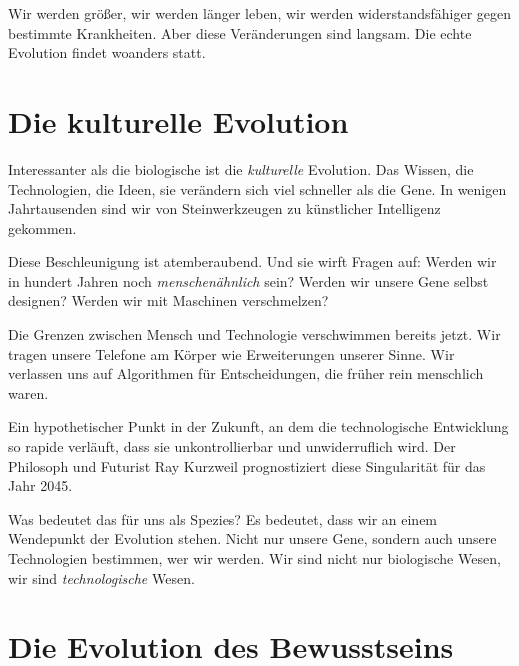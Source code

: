 Wir werden größer, wir werden länger leben, wir werden widerstandsfähiger gegen bestimmte Krankheiten. Aber diese Veränderungen sind langsam. Die echte Evolution findet woanders statt.

\section{Die kulturelle Evolution}

Interessanter als die biologische ist die \emph{kulturelle} Evolution. Das Wissen, die Technologien, die Ideen, sie verändern sich viel schneller als die Gene. In wenigen Jahrtausenden sind wir von Steinwerkzeugen zu künstlicher Intelligenz gekommen.

Diese Beschleunigung ist atemberaubend. Und sie wirft Fragen auf: Werden wir in hundert Jahren noch \emph{menschenähnlich} sein? Werden wir unsere Gene selbst designen? Werden wir mit Maschinen verschmelzen?

Die Grenzen zwischen Mensch und Technologie verschwimmen bereits jetzt. Wir tragen unsere Telefone am Körper wie Erweiterungen unserer Sinne. Wir verlassen uns auf Algorithmen für Entscheidungen, die früher rein menschlich waren.

\begin{defi}
	Ein hypothetischer Punkt in der Zukunft, an dem die technologische Entwicklung so rapide verläuft, dass sie unkontrollierbar und unwiderruflich wird. Der Philosoph und Futurist Ray Kurzweil prognostiziert diese Singularität für das Jahr 2045.
\end{defi}

Was bedeutet das für uns als Spezies? Es bedeutet, dass wir an einem Wendepunkt der Evolution stehen. Nicht nur unsere Gene, sondern auch unsere Technologien bestimmen, wer wir werden. Wir sind nicht nur biologische Wesen, wir sind \emph{technologische} Wesen.

\section{Die Evolution des Bewusstseins}


